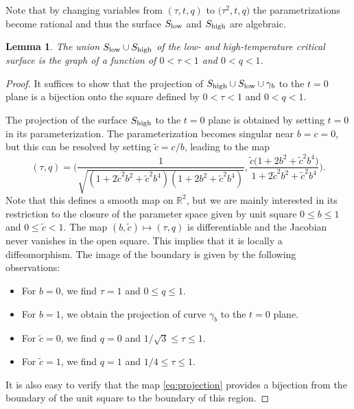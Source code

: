 \documentclass[pdftex]{sigma}
\numberwithin{equation}{section}
\newtheorem{Lemma}[Theorem]{Lemma}
\begin{document}
Note that by changing variables from $(\tau,t,q)$ to $\bigl(\tau^2,t,q\bigr)$ the parametrizations become rational and thus the surface $S_{{\rm low}}$ and $S_{{\rm high}}$ are algebraic.
\begin{Lemma} \label{lem:surface=graph}
 The union $S_{{\rm low}}\cup S_{{\rm high}}$ of the low- and high-temperature critical surface is the graph of a function of $0<\tau<1$ and $0<q<1$.
\end{Lemma}
\begin{proof}
It suffices to show that the projection of $S_{{\rm high}} \cup S_{{\rm low}}\cup \gamma_b$ to the $t=0$ plane is a bijection onto the square defined by $0 < \tau <1$ and $0 < q < 1$.

 The projection of the surface $S_{{\rm high}}$ to the $t=0$ plane is obtained by setting $t=0$ in its parameterization. The parameterization becomes singular near $b=c=0$, but this can be resolved by setting $\tilde c=c/b$, leading to the map
 \begin{equation} \label{eq:projection}
(\tau,q)= \Biggl(\frac{1}{\sqrt{(1+ 2\tilde c^2 b^2 + \tilde c^2b^4)(1+2b^2 +\tilde c^2b^4)}},
 \frac{\tilde c \bigl(1+2b^2 +\tilde c^2b^4\bigr)}{1+ 2\tilde c^2 b^2 + \tilde c^2b^4}
\Biggr).
\end{equation}
 Note that this defines a smooth map on $\mathbb R^2$, but we are mainly interested in its restriction to the closure of the parameter space given by unit square $0\leq b\leq 1$ and $0\leq \tilde c<1$. The map $(b,\tilde c) \mapsto (\tau,q)$ is differentiable and the Jacobian never vanishes in the open square. This implies that it is locally a diffeomorphism. The image of the boundary is given by the following observations:
\begin{itemize}\itemsep=0pt
\item For $b=0$, we find $\tau=1$ and $0\leq q \leq 1$.

\item For $b=1$, we obtain the projection of curve $\gamma_b$ to the $t=0$ plane.

\item For $\tilde c=0$, we find $q=0$ and $1/\sqrt{3} \leq \tau \leq 1$.

\item For $\tilde c=1$, we find $q=1$ and $1/4 \leq \tau \leq 1$.
\end{itemize}

 It is also easy to verify that the map \eqref{eq:projection} provides a bijection from the boundary of the unit square to the boundary of this region.


\end{proof}
\end{document}
